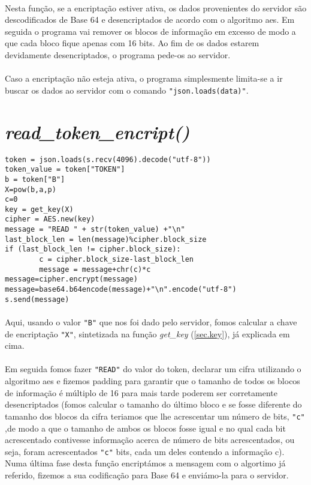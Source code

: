 \documentclass[a4paper]{report}
\begin{document}
\paragraph{}Nesta função, se a encriptação estiver ativa, os dados provenientes do servidor são descodificados de Base 64 e desencriptados de acordo com o algoritmo \ac{aes}. Em seguida o programa vai remover os blocos de informação em excesso de modo a que cada bloco fique apenas com 16 bits. Ao fim de os dados estarem devidamente desencriptados, o programa pede-os ao servidor.
\paragraph{}Caso a encriptação não esteja ativa, o programa simplesmente limita-se a ir buscar os dados ao servidor com o comando \texttt{"json.loads(data)"}.\cite{encript}

\newpage

\section{\textit{read\_token\_encript()}}
\begin{lstlisting}
token = json.loads(s.recv(4096).decode("utf-8"))
token_value = token["TOKEN"]
b = token["B"]
X=pow(b,a,p)
c=0        
key = get_key(X)
cipher = AES.new(key)
message = "READ " + str(token_value) +"\n"
last_block_len = len(message)%cipher.block_size
if (last_block_len != cipher.block_size):
        c = cipher.block_size-last_block_len
        message = message+chr(c)*c
message=cipher.encrypt(message)
message=base64.b64encode(message)+"\n".encode("utf-8")
s.send(message)
\end{lstlisting}
\paragraph{}Aqui, usando o valor \texttt{"B"} que nos foi dado pelo servidor, fomos calcular a chave de encriptação \texttt{"X"}, sintetizada na função \textit{get\_key} (\autoref{sec.key}), já explicada em cima.

\paragraph{}Em seguida fomos fazer \texttt{"READ"} do valor do token, declarar um cifra utilizando o algoritmo \ac{aes} e fizemos padding para garantir que o tamanho de todos os blocos de informação é múltiplo de 16 para mais tarde poderem ser corretamente desencriptados (fomos calcular  o tamanho do último bloco e se fosse diferente do tamanho dos blocos da cifra teriamos que lhe acrescentar um número de bits, \texttt{"c"} ,de modo a que o tamanho de ambos os blocos fosse igual e no qual cada bit acrescentado contivesse informação acerca de número de bits acrescentados, ou seja, foram acrescentados \texttt{"c"} bits, cada um deles contendo a informação c). Numa última fase desta função encriptámos a mensagem com o algortimo já referido, fizemos a sua codificação para Base 64 e enviámo-la para o servidor.\cite{encript}
\end{document}
